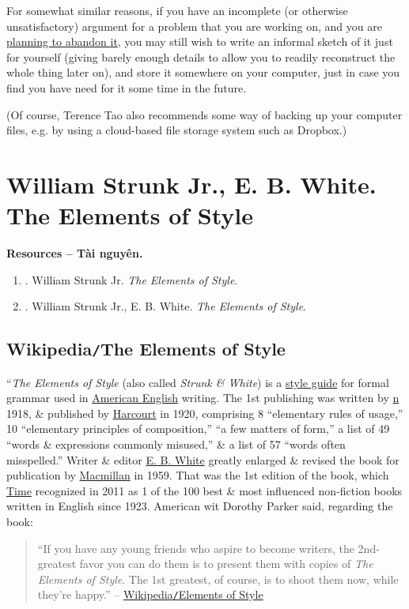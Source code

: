 \documentclass{article}
\begin{document}
%
For somewhat similar reasons, if you have an incomplete (or otherwise unsatisfactory) argument for a problem that you are working on, and you are \href{https://terrytao.wordpress.com/career-advice/use-the-wastebasket/}{planning to abandon it}, you may still wish to write an informal sketch of it just for yourself (giving barely enough details to allow you to readily reconstruct the whole thing later on), and store it somewhere on your computer, just in case you find you have need for it some time in the future.

(Of course, Terence Tao also recommends some way of backing up your computer files, e.g. by using a cloud-based file storage system such as Dropbox.)


\section{{\sc William Strunk Jr., E. B. White}. The Elements of Style}
\textbf{\textsf{Resources -- Tài nguyên.}}
\begin{enumerate}
	\item \cite{Strunk_element_style}. {\sc William Strunk Jr.} {\it The Elements of Style}.
	\item \cite{Strunk_White_element_style}. {\sc William Strunk Jr., E. B. White}. {\it The Elements of Style}.
\end{enumerate}

\subsection{Wikipedia{\tt/}The Elements of Style}
``{\it The Elements of Style} (also called {\it Strunk \& White}) is a \href{https://en.wikipedia.org/wiki/Style_guide}{style guide} for formal grammar used in \href{https://en.wikipedia.org/wiki/American_English}{American English} writing. The 1st publishing was written by \href{https://en.wikipedia.org/wiki/William_Strunk_Jr.} n 1918, \& published by \href{https://en.wikipedia.org/wiki/Harcourt_(publisher)}{Harcourt} in 1920, comprising 8 ``elementary rules of usage,'' 10 ``elementary principles of composition,'' ``a few matters of form,'' a list of 49 ``words \& expressions commonly misused,'' \& a list of 57 ``words often misspelled.'' Writer \& editor \href{https://en.wikipedia.org/wiki/E._B._White}{E. B. White} greatly enlarged \& revised the book for publication by \href{https://en.wikipedia.org/wiki/Macmillan_Publishers}{Macmillan} in 1959. That was the 1st edition of the book, which \href{https://en.wikipedia.org/wiki/Time_(magazine)}{Time} recognized in 2011 as 1 of the 100 best \& most influenced non-fiction books written in English since 1923. American wit Dorothy Parker said, regarding the book:
\begin{quote}
	``If you have any young friends who aspire to become writers, the 2nd-greatest favor you can do them is to present them with copies of {\it The Elements of Style}. The 1st greatest, of course, is to shoot them now, while they're happy.'' -- \href{https://en.wikipedia.org/wiki/The_Elements_of_Style}{Wikipedia{\tt/}Elements of Style}
\end{quote}
\end{document}
